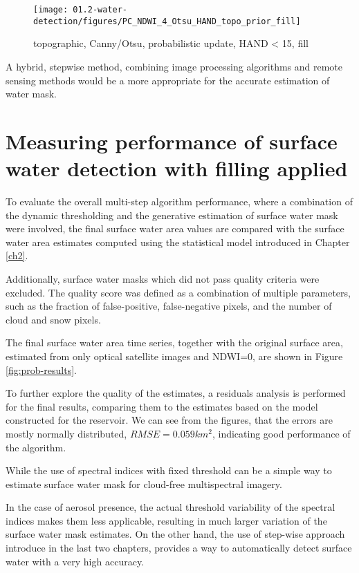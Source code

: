 \begin{figure}
	\centering
	\texttt{[image: 01.2-water-detection/figures/PC\_NDWI\_4\_Otsu\_HAND\_topo\_prior\_fill]}
	\caption{topographic, Canny/Otsu, probabilistic update, HAND < 15, fill}
	\label{fig:r1_canny_otsu_topo_hand_nb_fill}
\end{figure}

A hybrid, stepwise method, combining image processing algorithms and remote sensing methods would be a more appropriate for the accurate estimation of water mask.

\newpage


\section{Measuring performance of surface water detection with filling applied}

To evaluate the overall multi-step algorithm performance, where a combination of the dynamic thresholding and the generative estimation of surface water mask were involved, the final surface water area values are compared with the surface water area estimates computed using the statistical model introduced in Chapter \ref{ch2}. 

Additionally, surface water masks which did not pass quality criteria were excluded. The quality score was defined as a combination of multiple parameters, such as the fraction of false-positive, false-negative pixels, and the number of cloud and snow pixels. 

The final surface water area time series, together with the original surface area, estimated from only optical satellite images and NDWI=0, are shown in Figure \ref{fig:prob-results}.

To further explore the quality of the estimates, a residuals analysis is performed for the final results, comparing them to the estimates based on the model constructed for the reservoir. We can see from the figures, that the errors are mostly normally distributed, $RMSE=0.059km^2$, indicating good performance of the algorithm.

While the use of spectral indices with fixed threshold can be a simple way to estimate surface water mask for cloud-free multispectral imagery. 

In the case of aerosol presence, the actual threshold variability of the spectral indices makes them less applicable, resulting in much larger variation of the surface water mask estimates. On the other hand, the use of step-wise approach introduce in the last two chapters, provides a way to automatically detect surface water with a very high accuracy.

